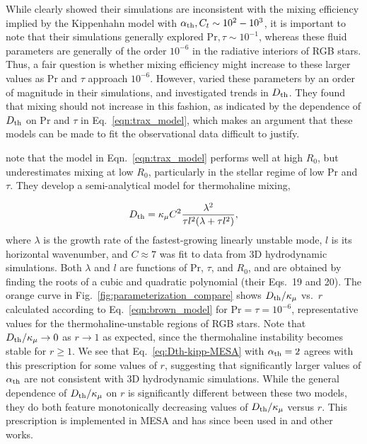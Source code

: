 While \citet{traxler_etal_2011} clearly showed their simulations are inconsistent with the mixing efficiency implied by the Kippenhahn model with $\alpha_{\rm{th}}, C_t \sim 10^2-10^3$, it is important to note that their simulations generally explored $\mathrm{Pr}, \tau \sim 10^{-1}$, whereas these fluid parameters are generally of the order $10^{-6}$ in the radiative interiors of RGB stars. 
Thus, a fair question is whether mixing efficiency might increase to these larger values as $\mathrm{Pr}$ and $\tau$ approach $10^{-6}$. 
However, \citet{traxler_etal_2011} varied these parameters by an order of magnitude in their simulations, and investigated trends in $D_\mathrm{th}$. They found that mixing should not increase in this fashion, as indicated by the dependence of $D_\mathrm{th}$ on $\mathrm{Pr}$ and $\tau$ in Eq.~\eqref{eqn:trax_model}, which makes an argument that these models can be made to fit the observational data difficult to justify. 

\citet{brown_etal_2013} note that the model in Eqn.~\eqref{eqn:trax_model} performs well at high $R_0$, but underestimates mixing at low $R_0$, particularly in the stellar regime of low Pr and $\tau$.
They develop a semi-analytical model for thermohaline mixing,

\begin{equation}
    \Dth = \kappa_{\mu}C^2\frac{\lambda^2}{\tau l^2(\lambda + \tau l^2)},
    \label{eqn:brown_model}
\end{equation}
where $\lambda$ is the growth rate of the fastest-growing linearly unstable mode, $l$ is its horizontal wavenumber, and $C \approx 7$ was fit to data from 3D hydrodynamic simulations.
Both $\lambda$ and $l$ are functions of $\mathrm{Pr}$, $\tau$, and $R_0$, and are obtained by finding the roots of a cubic and quadratic polynomial (their Eqs.~19 and 20).
The orange curve in Fig.~\ref{fig:parameterization_compare} shows $D_\mathrm{th}/\kappa_\mu$ vs.~$r$ calculated according to Eq.~\eqref{eqn:brown_model} for $\mathrm{Pr} = \tau = 10^{-6}$, representative values for the thermohaline-unstable regions of RGB stars. 
Note that $D_\mathrm{th}/\kappa_\mu \to 0$ as $r \to 1$ as expected, since the thermohaline instability becomes stable for $r \geq 1$.
We see that Eq.~\eqref{eq:Dth-kipp-MESA} with $\alpha_{\rm{th}} = 2$ agrees with this prescription for some values of $r$, suggesting that significantly larger values of $\alpha_{\rm{th}}$ are not consistent with 3D hydrodynamic simulations. 
While the general dependence of $D_\mathrm{th}/\kappa_\mu$ on $r$ is significantly different between these two models, they do both feature monotonically decreasing values of $D_\mathrm{th}/\kappa_\mu$ versus $r$. 
This prescription is implemented in MESA and has since been used in \citet{bauer_bildsten_2019} and other works. 


